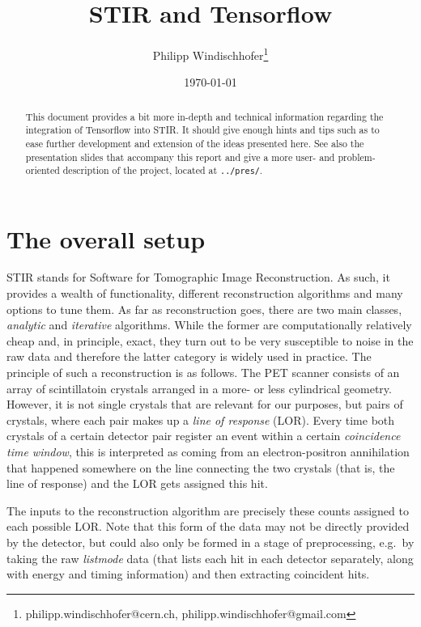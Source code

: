 \documentclass[a4paper, 11pt]{article}
\title{STIR and Tensorflow}
\author{Philipp Windischhofer\thanks{philipp.windischhofer@cern.ch, philipp.windischhofer@gmail.com}}
\date{\today}
\begin{document}
  \maketitle

  \begin{abstract}
    \noindent This document provides a bit more in-depth and technical information regarding the integration of Tensorflow into STIR. It should give enough hints and tips such as to ease further development and extension of the ideas presented here. See also the presentation slides that accompany this report and give a more user- and problem-oriented description of the project, located at \texttt{../pres/}.
  \end{abstract}

  \section{The overall setup}
  STIR stands for Software for Tomographic Image Reconstruction. As such, it provides a wealth of functionality, different reconstruction algorithms and many options to tune them. As far as reconstruction goes, there are two main classes, \textsl{analytic} and \textsl{iterative} algorithms. While the former are computationally relatively cheap and, in principle, exact, they turn out to be very susceptible to noise in the raw data and therefore the latter category is widely used in practice. 
  The principle of such a reconstruction is as follows. The PET scanner consists of an array of scintillatoin crystals arranged in a more- or less cylindrical geometry. However, it is not single crystals that are relevant for our purposes, but pairs of crystals, where each pair makes up a \textsl{line of response} (LOR). Every time both crystals of a certain detector pair register an event within a certain \textsl{coincidence time window}, this is interpreted as coming from an electron-positron annihilation that happened somewhere on the line connecting the two crystals (that is, the line of response) and the LOR gets assigned this hit. 

  The inputs to the reconstruction algorithm are precisely these counts assigned to each possible LOR. Note that this form of the data may not be directly provided by the detector, but could also only be formed in a stage of preprocessing, e.g.~by taking the raw \textsl{listmode} data (that lists each hit in each detector separately, along with energy and timing information) and then extracting coincident hits.
\end{document}
